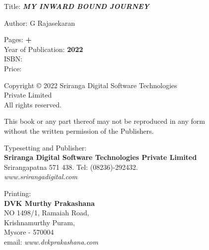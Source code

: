 \thispagestyle{empty}

\noindent
Title: {\sl\bfseries MY INWARD BOUND JOURNEY}
\medskip

\noindent
Author:  G Rajasekaran    

\vfill

\noindent
Pages: {\bf \pageref{foreword} + \pageref{bookend}}\\
Year of Publication: {\bf 2022}\\
ISBN: {\bf }\\
Price: {\bf }
\vfill

\noindent
Copyright © 2022 Sriranga Digital Software Technologies\\ Private Limited\\
All rights reserved.
\vfill

\noindent
This book or any part thereof may not be reproduced in any form\\ without the written permission of the Publishers.
\vfill

\noindent
Typesetting and Publisher:\\
{\bf Sriranga Digital Software Technologies Private Limited}\\ 
Srirangapatna 571 438. Tel: (08236)-292432.\\
{\sl www.srirangadigital.com}\\
\vfill

\noindent
Printing:\\
{\bf DVK Murthy Prakashana}\\
NO 1498/1, Ramaiah Road,\\ 
Krishnamurthy Puram,\\ 
Mysore - 570004\\
email: {\sl www.dvkprakashana.com}

